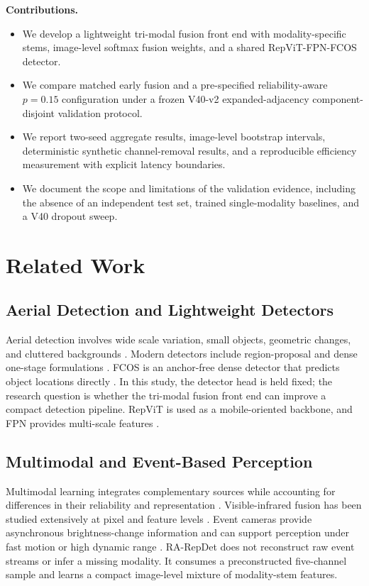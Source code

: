 \noindent\textbf{Contributions.}
\begin{itemize}
    \item We develop a lightweight tri-modal fusion front end with modality-specific stems, image-level softmax fusion weights, and a shared RepViT-FPN-FCOS detector.
    \item We compare matched early fusion and a pre-specified reliability-aware $p=0.15$ configuration under a frozen V40-v2 expanded-adjacency component-disjoint validation protocol.
    \item We report two-seed aggregate results, image-level bootstrap intervals, deterministic synthetic channel-removal results, and a reproducible efficiency measurement with explicit latency boundaries.
    \item We document the scope and limitations of the validation evidence, including the absence of an independent test set, trained single-modality baselines, and a V40 dropout sweep.
\end{itemize}

\section{Related Work}
\subsection{Aerial Detection and Lightweight Detectors}
Aerial detection involves wide scale variation, small objects, geometric changes, and cluttered backgrounds \cite{cheng2016survey,zhu2017deepRS,xia2022dota}. Modern detectors include region-proposal and dense one-stage formulations \cite{ren2017faster,lin2020focal}. FCOS is an anchor-free dense detector that predicts object locations directly \cite{tian2019fcos}. In this study, the detector head is held fixed; the research question is whether the tri-modal fusion front end can improve a compact detection pipeline. RepViT is used as a mobile-oriented backbone, and FPN provides multi-scale features \cite{wang2024repvit,lin2017fpn}.

\subsection{Multimodal and Event-Based Perception}
Multimodal learning integrates complementary sources while accounting for differences in their reliability and representation \cite{baltrusaitis2019multimodal,ramachandram2017deep}. Visible-infrared fusion has been studied extensively at pixel and feature levels \cite{li2017pixel,ma2019surveyfusion,li2019densefuse}. Event cameras provide asynchronous brightness-change information and can support perception under fast motion or high dynamic range \cite{lichtsteiner2008sensor,gallego2022event,gehrig2021dsec}. RA-RepDet does not reconstruct raw event streams or infer a missing modality. It consumes a preconstructed five-channel sample and learns a compact image-level mixture of modality-stem features.

